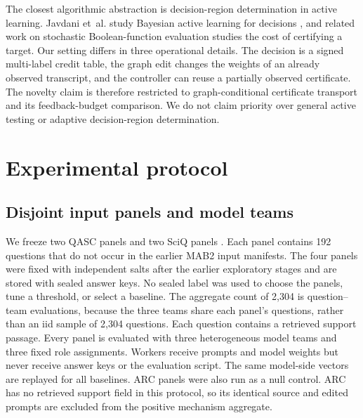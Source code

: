 \documentclass[11pt]{article}
\newcommand{\ctdr}{\textsc{CTDR}}
\begin{document}
The closest algorithmic abstraction is decision-region determination in active learning. Javdani et~al. study Bayesian active learning for decisions \citep{javdani}, and related work on stochastic Boolean-function evaluation studies the cost of certifying a target. Our setting differs in three operational details. The decision is a signed multi-label credit table, the graph edit changes the weights of an already observed transcript, and the controller can reuse a partially observed certificate. The novelty claim is therefore restricted to graph-conditional certificate transport and its feedback-budget comparison. We do not claim priority over general active testing or adaptive decision-region determination.

\section{Experimental protocol}
\subsection{Disjoint input panels and model teams}
We freeze two QASC panels \citep{qascdata} and two SciQ panels \citep{sciq}. Each panel contains 192 questions that do not occur in the earlier MAB2 input manifests. The four panels were fixed with independent salts after the earlier exploratory stages and are stored with sealed answer keys. No sealed label was used to choose the panels, tune a threshold, or select a baseline. The aggregate count of 2,304 is question--team evaluations, because the three teams share each panel's questions, rather than an iid sample of 2,304 questions. Each question contains a retrieved support passage. Every panel is evaluated with three heterogeneous model teams and three fixed role assignments. Workers receive prompts and model weights but never receive answer keys or the evaluation script. The same model-side vectors are replayed for all baselines. ARC panels were also run as a null control. ARC has no retrieved support field in this protocol, so its identical source and edited prompts are excluded from the positive mechanism aggregate.

\begin{table}[t]
\centering\small
{}
\caption{Panel-level action errors averaged over the three model teams. \ctdr{} has zero error on every row.}
\label{tab:panels}
\end{table}
\end{document}
